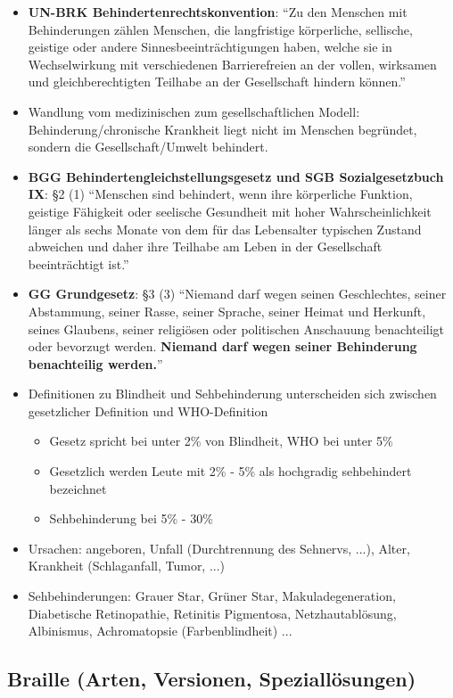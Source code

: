 \documentclass[paper=a4, fontsize=11pt]{scrartcl} %
\numberwithin{equation}{section} %
\numberwithin{figure}{section} %
\numberwithin{table}{section} %
\begin{document}
\begin{itemize}
\item \textbf{UN-BRK Behindertenrechtskonvention}: ``Zu den Menschen mit Behinderungen zählen Menschen, die langfristige körperliche, sellische, geistige oder andere Sinnesbeeinträchtigungen haben, welche sie in Wechselwirkung mit verschiedenen Barrierefreien an der vollen, wirksamen und gleichberechtigten Teilhabe an der Gesellschaft hindern können.''
\item Wandlung vom medizinischen zum gesellschaftlichen Modell: Behinderung/chronische Krankheit liegt nicht im Menschen begründet, sondern die Gesellschaft/Umwelt behindert.
\item \textbf{BGG Behindertengleichstellungsgesetz und SGB Sozialgesetzbuch IX}: §2 (1) ``Menschen sind behindert, wenn ihre körperliche Funktion, geistige Fähigkeit oder seelische Gesundheit mit hoher Wahrscheinlichkeit länger als sechs Monate von dem für das Lebensalter typischen Zustand abweichen und daher ihre Teilhabe am Leben in der Gesellschaft beeinträchtigt ist.''
\item \textbf{GG Grundgesetz}: §3 (3) ``Niemand darf wegen seinen Geschlechtes, seiner Abstammung, seiner Rasse, seiner Sprache, seiner Heimat und Herkunft, seines Glaubens, seiner religiösen oder politischen Anschauung benachteiligt oder bevorzugt werden. \textbf{Niemand darf wegen seiner Behinderung benachteilig werden.}''
\item Definitionen zu Blindheit und Sehbehinderung unterscheiden sich zwischen gesetzlicher Definition und WHO-Definition
\begin{itemize}
\item Gesetz spricht bei unter 2\% von Blindheit, WHO bei unter 5\%
\item Gesetzlich werden Leute mit 2\% - 5\% als hochgradig sehbehindert bezeichnet
\item Sehbehinderung bei 5\% - 30\%
\end{itemize}
\item Ursachen: angeboren, Unfall (Durchtrennung des Sehnervs, ...), Alter, Krankheit (Schlaganfall, Tumor, ...)
\item Sehbehinderungen: Grauer Star, Grüner Star, Makuladegeneration, Diabetische Retinopathie, Retinitis Pigmentosa, Netzhautablösung, Albinismus, Achromatopsie (Farbenblindheit) ...
\end{itemize}

\subsection{Braille (Arten, Versionen, Speziallösungen)}
\end{document}
